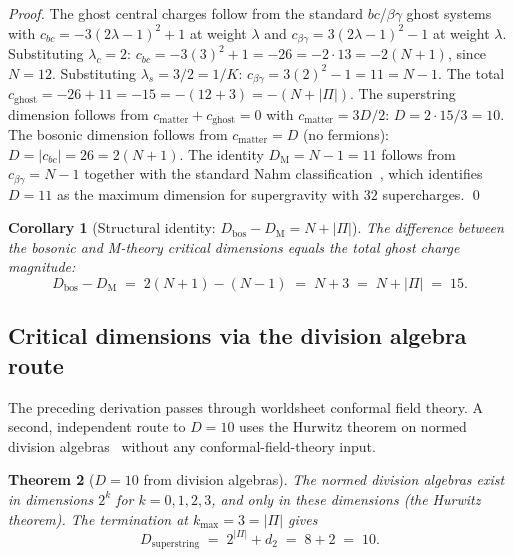 \documentclass[11pt,a4paper]{article}
\newtheorem{theorem}{Theorem}[section]
\newtheorem{corollary}[theorem]{Corollary}
\theoremstyle{definition}
\theoremstyle{remark}
\begin{document}
\begin{proof}
The ghost central charges follow from the standard $bc$/$\beta\gamma$ ghost systems~\cite{MiaoLi} with $c_{bc} = -3(2\lambda-1)^{2}+1$ at weight $\lambda$ and $c_{\beta\gamma} = 3(2\lambda-1)^{2}-1$ at weight $\lambda$. Substituting $\lambda_{c} = 2$: $c_{bc} = -3(3)^{2}+1 = -26 = -2 \cdot 13 = -2(N+1)$, since $N = 12$. Substituting $\lambda_{s} = 3/2 = 1/K$: $c_{\beta\gamma} = 3(2)^{2} - 1 = 11 = N-1$. The total $c_{\mathrm{ghost}} = -26 + 11 = -15 = -(12+3) = -(N+|\Pi|)$. The superstring dimension follows from $c_{\mathrm{matter}} + c_{\mathrm{ghost}} = 0$ with $c_{\mathrm{matter}} = 3D/2$: $D = 2 \cdot 15 / 3 = 10$. The bosonic dimension follows from $c_{\mathrm{matter}} = D$ (no fermions): $D = |c_{bc}| = 26 = 2(N+1)$. The identity $D_{\mathrm{M}} = N - 1 = 11$ follows from $c_{\beta\gamma} = N - 1$ together with the standard Nahm classification~\cite{Nahm1978}, which identifies $D = 11$ as the maximum dimension for supergravity with $32$ supercharges. \qed
\end{proof}

\begin{corollary}[Structural identity: $D_{\mathrm{bos}} - D_{\mathrm{M}} = N + |\Pi|$]\label{cor:Dbos-DM}
The difference between the bosonic and M-theory critical dimensions equals the total ghost charge magnitude:
\[
D_{\mathrm{bos}} - D_{\mathrm{M}} \;=\; 2(N+1) - (N-1) \;=\; N + 3 \;=\; N + |\Pi| \;=\; 15.
\]
\end{corollary}

\subsection{Critical dimensions via the division algebra route}\label{subsec:critical-div-alg}

The preceding derivation passes through worldsheet conformal field theory. A second, independent route to $D = 10$ uses the Hurwitz theorem on normed division algebras~\cite{Hurwitz1898} without any conformal-field-theory input.

\begin{theorem}[$D = 10$ from division algebras]\label{thm:D10-div-alg}
The normed division algebras exist in dimensions $2^{k}$ for $k = 0,1,2,3$, and only in these dimensions (the Hurwitz theorem). The termination at $k_{\max} = 3 = |\Pi|$ gives
\begin{equation}\label{eq:D10-div-alg}
\boxed{\;D_{\mathrm{superstring}} \;=\; 2^{|\Pi|} + d_{2} \;=\; 8 + 2 \;=\; 10.\;}
\end{equation}
\end{theorem}
\end{document}
